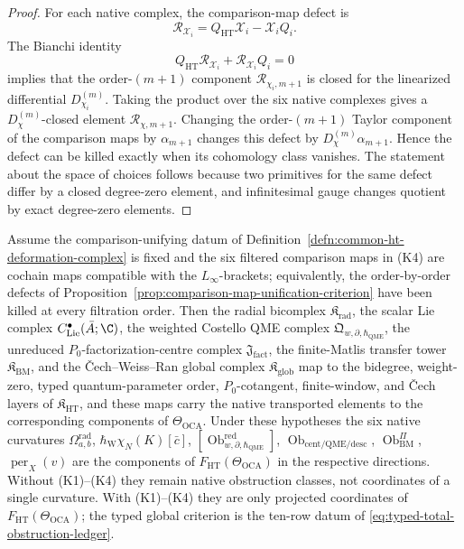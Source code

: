 \begin{proof}
For each native complex, the comparison-map defect is
\[
  \mathcal R_{\mathcal X_i}
  =
  Q_{\mathrm{HT}}\mathcal X_i-\mathcal X_iQ_i .
\]
The Bianchi identity
\[
  Q_{\mathrm{HT}}\mathcal R_{\mathcal X_i}
  +\mathcal R_{\mathcal X_i}Q_i=0
\]
implies that the order-\((m+1)\) component
\(\mathcal R_{\chi_i,m+1}\) is closed for the linearized differential
\(D^{(m)}_{\chi_i}\).  Taking the product over the six native complexes
gives a \(D^{(m)}_{\chi}\)-closed element
\(\mathcal R_{\chi,m+1}\).  Changing the order-\((m+1)\) Taylor
component of the comparison maps by \(\alpha_{m+1}\) changes this defect
by \(D^{(m)}_{\chi}\alpha_{m+1}\).  Hence the defect can be killed
exactly when its cohomology class vanishes.  The statement about the
space of choices follows because two primitives for the same defect
differ by a closed degree-zero element, and infinitesimal gauge changes
quotient by exact degree-zero elements.
\end{proof}

\begin{prop}\label{prop:six-projections}
Assume the comparison-unifying datum of
Definition~\ref{defn:common-ht-deformation-complex} is fixed and the
six filtered comparison maps in \textup{(K4)} are cochain maps
compatible with the \(L_\infty\)-brackets; equivalently, the
order-by-order defects of
Proposition~\ref{prop:comparison-map-unification-criterion} have been
killed at every filtration order.  Then
the radial bicomplex \(\mathfrak K_{\mathrm{rad}}\), the scalar Lie
complex \(C^\bullet_{\mathrm{Lie}}(\bar A;\C)\), the weighted Costello
QME complex \(\mathfrak Q_{w,\partial,\hbar_{\mathrm{QME}}}\), the unreduced
\(P_0\)-factorization-centre complex \(\mathfrak J_{\mathrm{fact}}\),
the finite-Matlis transfer tower \(\mathfrak K_{\mathrm{BM}}\), and the
\v Cech--Weiss--Ran global complex \(\mathfrak K_{\mathrm{glob}}\) map to
the bidegree, weight-zero, typed quantum-parameter order, \(P_0\)-cotangent,
finite-window, and \v Cech layers of \(\mathfrak K_{\mathrm{HT}}\),
and these maps carry the native transported elements to the corresponding
components of \(\Theta_{\mathrm{OCA}}\).  Under these hypotheses the
six native curvatures
\(\Omega^{\mathrm{rad}}_{a,b}\),
\(\hbar_{\mathrm{W}}\chi_N(K)[\bar c]\),
\([\operatorname{Ob}^{\mathrm{red}}_{w,\partial,\hbar_{\mathrm{QME}}}]\),
\(\operatorname{Ob}_{\mathrm{cent/QME/desc}}\),
\(\operatorname{Ob}^{\Pi}_{\mathrm{BM}}\),
\(\operatorname{per}_X(v)\) are the components of
\(F_{\mathrm{HT}}(\Theta_{\mathrm{OCA}})\) in the respective directions.
Without \textup{(K1)--(K4)} they remain native obstruction classes, not
coordinates of a single curvature.  With \textup{(K1)--(K4)} they are
only projected coordinates of \(F_{\mathrm{HT}}(\Theta_{\mathrm{OCA}})\);
the typed global criterion is the ten-row datum of
\eqref{eq:typed-total-obstruction-ledger}.
\end{prop}

